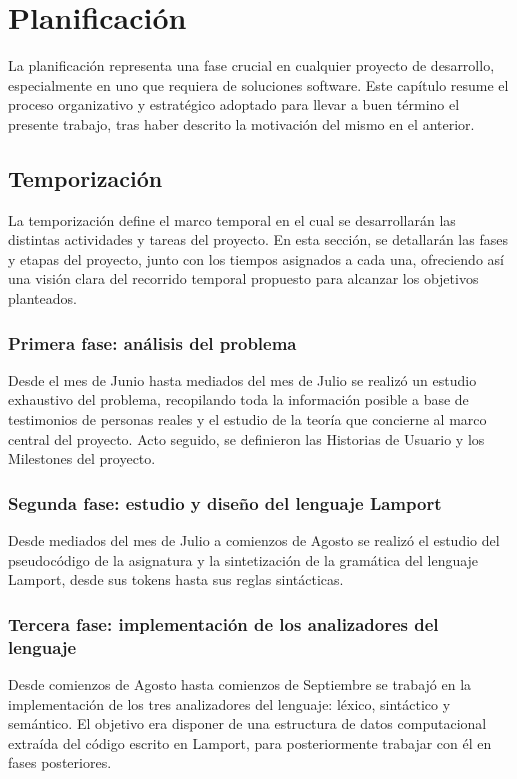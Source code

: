 \chapter{Planificación}
La planificación representa una fase crucial en cualquier proyecto de desarrollo, especialmente en uno que requiera de soluciones software. Este capítulo resume el proceso organizativo y estratégico adoptado para llevar a buen término el presente trabajo, tras haber descrito la motivación del mismo en el anterior.

\section{Temporización}
La temporización define el marco temporal en el cual se desarrollarán las distintas actividades y tareas del proyecto. En esta sección, se detallarán las fases y etapas del proyecto, junto con los tiempos asignados a cada una, ofreciendo así una visión clara del recorrido temporal propuesto para alcanzar los objetivos planteados.

\subsection{Primera fase: análisis del problema}
Desde el mes de Junio hasta mediados del mes de Julio se realizó un estudio exhaustivo del problema, recopilando toda la información posible a base de testimonios de personas reales y el estudio de la teoría que concierne al marco central del proyecto. Acto seguido, se definieron las Historias de Usuario y los Milestones del proyecto.

\subsection{Segunda fase: estudio y diseño del lenguaje Lamport}
Desde mediados del mes de Julio a comienzos de Agosto se realizó el estudio del pseudocódigo de la asignatura y la sintetización de la gramática del lenguaje Lamport, desde sus tokens hasta sus reglas sintácticas.

\subsection{Tercera fase: implementación de los analizadores del lenguaje}
Desde comienzos de Agosto hasta comienzos de Septiembre se trabajó en la implementación de los tres analizadores del lenguaje: léxico, sintáctico y semántico. El objetivo era disponer de una estructura de datos computacional extraída del código escrito en Lamport, para posteriormente trabajar con él en fases posteriores.

